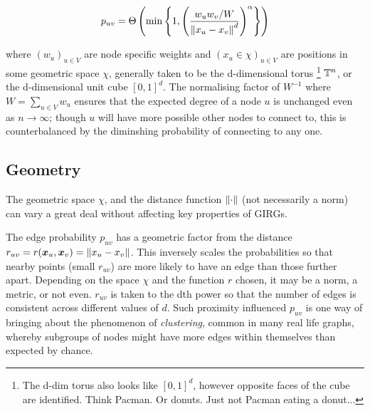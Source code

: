 \begin{equation}
    p_{uv} = \Theta \left ( \min \left \{ 
        1,
        \left (
            \frac{w_u w_v / W}{\left\lVert x_u - x_v\right\rVert^d}
        \right )^\alpha    
    \right \}
    \right )
\end{equation}

where $(w_u)_{u \in V}$ are node specific weights and $(x_u \in \chi)_{u \in V}$ are positions in some geometric space $\chi$, generally taken to be the d-dimensional torus
\footnote{The d-dim torus also looks like $[0, 1]^d$, however opposite faces of the cube are identified. Think Pacman. Or donuts. Just not Pacman eating a donut...}
$\mathbb{T}^n$, or the d-dimensional unit cube $[0, 1]^d$.
The normalising factor of $W^{-1}$ where $W = \sum_{u \in V} w_u$ ensures that the expected degree of a node $u$ is unchanged even as $n \to \infty$; though $u$ will have more possible other nodes to connect to, this is counterbalanced by the diminshing probability of connecting to any one.





\subsection{Geometry}
The geometric space $\chi$, and the distance function $\left\lVert \cdot\right\rVert$ (not necessarily a norm) can vary a great deal without affecting key properties of GIRGs.

The edge probability $p_{uv}$ has a geometric factor from the distance $r_{uv} = r(\bm{x}_u, \bm{x}_v) = \left\lVert x_u - x_v\right\rVert$.
This inversely scales the probabilities so that nearby points (small $r_{uv}$) are more likely to have an edge than those further apart.
Depending on the space $\chi$ and the function $r$ chosen, it may be a norm, a metric, or not even.
$r_{uv}$ is taken to the dth power so that the number of edges is consistent across different values of $d$.
Such proximity influenced $p_{uv}$ is one way of bringing about the phenomenon of \textit{clustering}, common in many real life graphs, whereby subgroups of nodes might have more edges within themselves than expected by chance.



